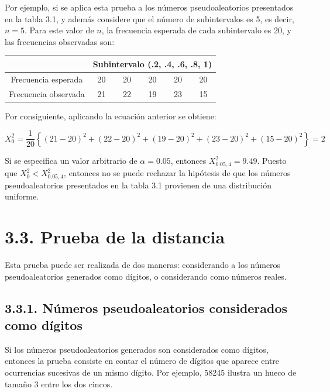 \documentclass[11pt,letterpaper]{report}
\begin{document}
Por ejemplo, si se aplica esta prueba a los números pseudoaleatorios
presentados en la tabla 3.1, y además considere que el número de
subintervalos es 5, es decir, $n=5$. Para este valor de $n$, la
frecuencia esperada de cada subintervalo es 20, y las frecuencias
observadas son:

\begin{table}[H]
\centering
\begin{tabular}{cccccc}
\toprule
 & \multicolumn{5}{c}{Subintervalo (.2, .4, .6, .8, 1)} \\
\midrule
Frecuencia esperada & 20 & 20 & 20 & 20 & 20 \\
Frecuencia observada & 21 & 22 & 19 & 23 & 15 \\
\bottomrule
\end{tabular}
\end{table}

Por consiguiente, aplicando la ecuación anterior se obtiene:

\begin{equation}
X_0^2 = \frac{1}{20}\left\{ (21-20)^2 + (22-20)^2 + (19-20)^2 + (23-20)^2 + (15-20)^2 \right\} = 2
\end{equation}

Si se especifica un valor arbitrario de $\alpha = 0.05$, entonces
$X^2_{0.05,4} = 9.49$. Puesto que $X_0^2 < X^2_{0.05,4}$, entonces no se
puede rechazar la hipótesis de que los números pseudoaleatorios
presentados en la tabla 3.1 provienen de una distribución uniforme.

\section*{3.3. Prueba de la distancia}

Esta prueba puede ser realizada de dos maneras: considerando a los
números pseudoaleatorios generados como dígitos, o considerando como
números reales.

\subsection*{3.3.1. Números pseudoaleatorios considerados como dígitos}

Si los números pseudoaleatorios generados son considerados como
dígitos, entonces la prueba consiste en contar el número de dígitos que
aparece entre ocurrencias sucesivas de un mismo dígito. Por ejemplo,
58245 ilustra un hueco de tamaño 3 entre los dos cincos.
\end{document}
